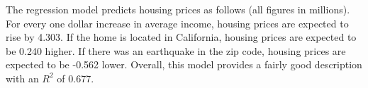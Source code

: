 



The regression model predicts housing prices as follows 
(all figures in millions).
For every one dollar increase in average income, housing prices are expected 
to rise by 4.303. 
If the home is located in California, housing prices are expected 
to be 0.240 higher. 
If there was an earthquake in the zip code, housing prices are expected 
to be -0.562 lower. 
Overall, this model provides a fairly good description with an $R^2$ of 0.677.

